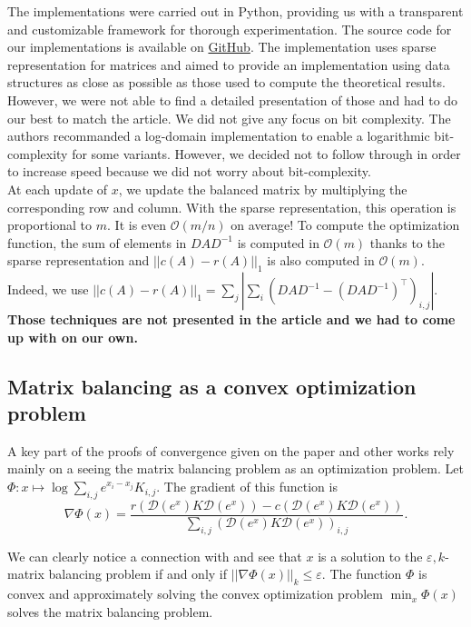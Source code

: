The implementations were carried out in Python, providing us with a transparent and customizable framework for thorough experimentation. The source code for our implementations is available on \href{https://github.com/alexicanesse/Near-linear-convergence-of-the-Random-Osborne-algorithm-for-Matrix-Balancing}{GitHub}. The implementation uses sparse representation for matrices and aimed to provide an implementation using data structures as close as possible as those used to compute the theoretical results. However, we were not able to find a detailed presentation of those and had to do our best to match the article. We did not give any focus on bit complexity. The authors recommanded a log-domain implementation to enable a logarithmic bit-complexity for some variants. However, we decided not to follow through in order to increase speed because we did not worry about bit-complexity.\\

At each update of \(x\), we update the balanced matrix by multiplying the corresponding row and column. With the sparse representation, this operation is proportional to \(m\). It is even \(\mathcal O(m/n)\) on average! To compute the optimization function, the sum of elements in \(DAD^{-1}\) is computed in \(\mathcal O (m)\) thanks to the sparse representation and \(||c(A) - r(A)||_1\) is also computed in \(\mathcal O(m)\). Indeed, we use \(||c(A) - r(A)||_1 = \sum_j \left| \sum_i (DAD^{-1} - (DAD^{-1})^\top)_{i,j}\right|\). \textbf{Those techniques are not presented in the article and we had to come up with on our own.}\\

\subsection{Matrix balancing as a convex optimization problem}

A key part of the proofs of convergence given on the paper and other works rely mainly on a seeing the matrix balancing problem as an optimization problem. Let \(\Phi : x \mapsto \log \sum_{i,j} e^{x_i - x_j} K_{i,j}\). The gradient of this function is 
\[
    \nabla \Phi (x) = \dfrac{r\left( \mathcal D(e^x)K\mathcal D(e^{x}) \right) - c\left( \mathcal D(e^x)K\mathcal D(e^{x}) \right)}{\sum_{i,j}\left( \mathcal D(e^x)K\mathcal D(e^{x}) \right)_{i,j}}.    
\]

We can clearly notice a connection with  and see that \(x\) is a solution to the \(\varepsilon, k\)-matrix balancing problem if and only if \(||\nabla \Phi(x)||_k \leq \varepsilon\). The function \(\Phi\) is convex and approximately solving the convex optimization problem \(\min_x \Phi(x)\) solves the matrix balancing problem.\\

